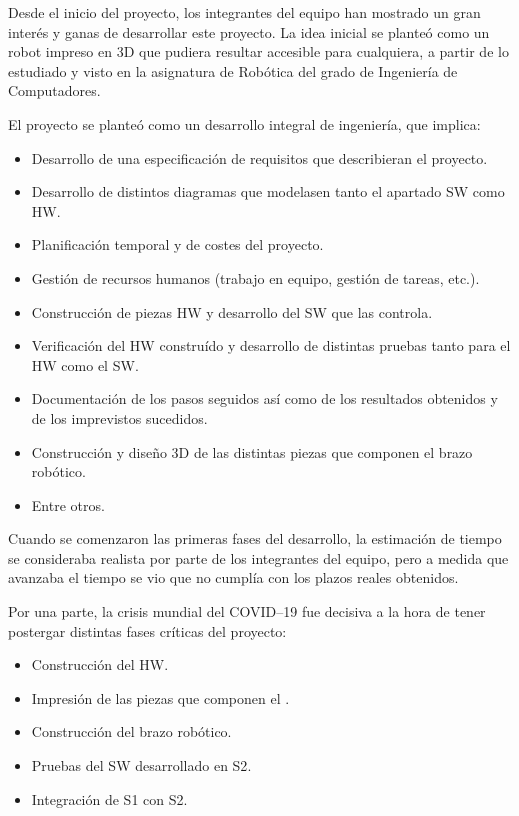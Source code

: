 Desde el inicio del proyecto, los integrantes del equipo han mostrado un gran interés
y ganas de desarrollar este proyecto. La idea inicial se planteó como un robot
impreso en 3D que pudiera resultar accesible para cualquiera, a partir de lo estudiado
y visto en la asignatura de Robótica del grado de Ingeniería de Computadores.

El proyecto se planteó como un desarrollo integral de ingeniería, que implica:
\begin{itemize}
    \item Desarrollo de una especificación de requisitos que describieran el proyecto.
    \item Desarrollo de distintos diagramas que modelasen tanto el apartado
    \ac{SW} como \ac{HW}.
    \item Planificación temporal y de costes del proyecto.
    \item Gestión de recursos humanos (trabajo en equipo, gestión de tareas, etc.).
    \item Construcción de piezas \ac{HW} y desarrollo del \ac{SW} que las controla.
    \item Verificación del \ac{HW} construído y desarrollo de distintas pruebas tanto
    para el \ac{HW} como el \ac{SW}.
    \item Documentación de los pasos seguidos así como de los resultados obtenidos
    y de los imprevistos sucedidos.
    \item Construcción y diseño 3D de las distintas piezas que componen el brazo
    robótico.
    \item Entre otros.
\end{itemize}

Cuando se comenzaron las primeras fases del desarrollo, la estimación de tiempo
se consideraba realista por parte de los integrantes del equipo, pero a medida
que avanzaba el tiempo se vio que no cumplía con los plazos reales obtenidos.

Por una parte, la crisis mundial del COVID--19 fue decisiva a la hora de tener
postergar distintas fases críticas del proyecto:
\begin{itemize}
    \item Construcción del \ac{HW}.
    \item Impresión de las piezas que componen el \pArm{}.
    \item Construcción del brazo robótico.
    \item Pruebas del \ac{SW} desarrollado en \ac{S2}.
    \item Integración de \ac{S1} con \ac{S2}.
\end{itemize}

